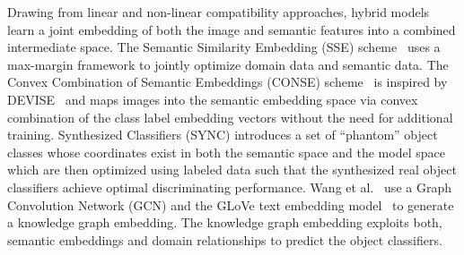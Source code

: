 \par
\medskip

Drawing from linear and non-linear compatibility approaches, hybrid models~\cite{gbu} learn a joint embedding of both the image and semantic features into a combined intermediate space. The Semantic Similarity Embedding (SSE) scheme~\cite{sse} uses a max-margin framework to jointly optimize domain data and semantic data. The Convex Combination of Semantic Embeddings (CONSE) scheme~\cite{conse} is inspired by DEVISE~\cite{devise} and maps images into the semantic embedding space via convex combination of the class label embedding vectors without the need for additional training. Synthesized Classifiers (SYNC) \cite{sync} introduces a set of “phantom” object classes whose coordinates exist in both the semantic space and the model space which are then optimized using labeled data such that the synthesized real object classifiers achieve optimal discriminating performance. Wang et al.~\cite{gcn} use a Graph Convolution Network (GCN) and the GLoVe text embedding model~\cite{glove} to generate a knowledge graph embedding. The knowledge graph embedding exploits both, semantic embeddings and domain relationships to predict the object classifiers. 

\par
\medskip

